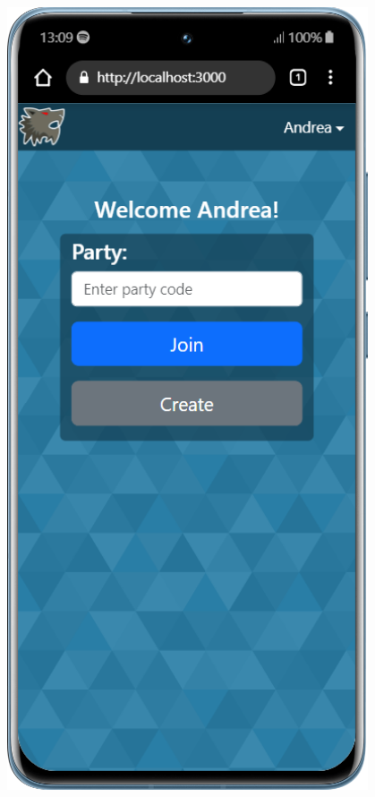 \begin{figure}[H]
    \centering
    \begin{minipage}{0.25\textwidth}
        \centering
        \includegraphics[width=0.95\textwidth]{img/screen/mobile/party_mobile.png}

\end{minipage}
\end{figure}
